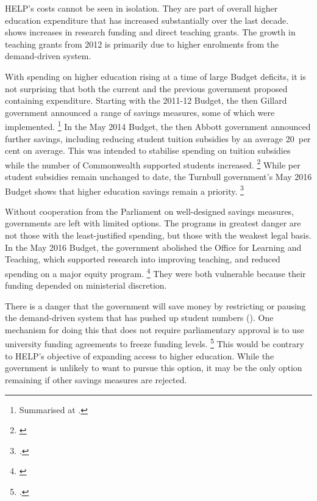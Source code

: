 \documentclass[embargoed]{grattan}
\begin{document}
\gls{HELP}'s costs cannot be seen in isolation.
They are part of overall higher education expenditure that has increased substantially over the last decade.
 shows increases in research funding and direct teaching grants.
The growth in teaching grants from 2012 is primarily due to higher enrolments from the demand-driven system.

With spending on higher education rising at a time of large Budget deficits, it is not surprising that both the current and the previous government proposed containing expenditure.
Starting with the 2011-12 Budget, the then Gillard government announced a range of savings measures, some of which were implemented.%
\footnote{Summarised at \textcite[][p. 12]{Warburton2016ResourcingAustraliastertiary}.} In the May 2014 Budget, the then Abbott government announced further savings, including reducing student tuition subsidies by an average 20~per cent on average.
This was intended to stabilise spending on tuition subsidies while the number of \gls{Commonwealth supported} students increased.%
\footnote{\textcite[][67--69]{Education2014Portfoliobudgetstatements}} 
While per student subsidies remain unchanged to date, the Turnbull government's May 2016 Budget shows that higher education savings remain a priority.%
\footcite{Education2016DrivingInnovationFairness}

Without cooperation from the Parliament on well-designed savings measures, governments are left with limited options.
The programs in greatest danger are not those with the least-justified spending, but those with the weakest legal basis.
In the May 2016 Budget, the government abolished the Office for Learning and Teaching, which supported research into improving teaching, and reduced spending on a major equity program.%
\footnote{\textcite[][57]{Education2016Portfoliobudgetstatements}} 
They were both vulnerable because their funding depended on ministerial discretion.

There is a danger that the government will save money by restricting or pausing the demand-driven system that has pushed up student numbers ().
One mechanism for doing this that does not require parliamentary approval is to use university funding agreements to freeze funding levels.%
\footcite[][Chapter~7]{Norton2013Keepcapsoff} 
This would be contrary to \gls{HELP}'s objective of expanding access to higher education.
While the government is unlikely to want to pursue this option, it may be the only option remaining if other savings measures are rejected.
\end{document}
